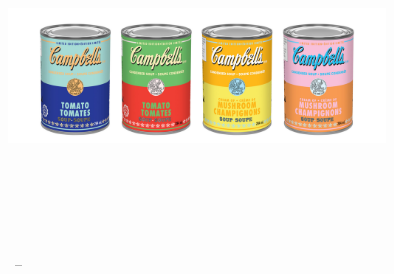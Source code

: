 
\begin{titlepage}

\begin{addmargin}[-1cm]{-3cm}
\begin{center}
\large

\hfill
\vfill

\begingroup
\color{Maroon}\spacedallcaps{\myTitle} \\ \bigskip %
\endgroup

\spacedlowsmallcaps{\myName} %

\vfill

\includegraphics[width=10cm]{gfx/soupcans} \\ \medskip %

\mySubtitle \\ \medskip %
\myDepartment \\
\myFaculty \\
\myUni \\ \bigskip

\myTime\ -- \myVersion %

\vfill

\end{center}
\end{addmargin}

\end{titlepage}